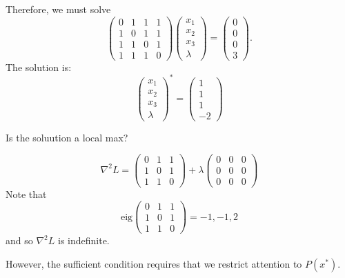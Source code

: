 \documentclass{article}
\begin{document}
	Therefore, we must solve
	\[ 
		\begin{pmatrix}
	    	0 & 1 & 1 & 1\\
	    	1 & 0 & 1 & 1\\
	    	1 & 1 & 0 & 1\\
	    	1 & 1 & 1 & 0
	  	\end{pmatrix}
	  	\begin{pmatrix}
	    	x_1\\
	    	x_2\\
	    	x_3\\
	    	\lambda
	  	\end{pmatrix} 
	  	= \begin{pmatrix}
	    	0\\0\\0\\3
	  	  \end{pmatrix}.
	\]
	The solution is:
	\[ 
		\begin{pmatrix}
	    	x_1\\
	    	x_2\\
	    	x_3\\
	    	\lambda 
	  	\end{pmatrix}^\ast
	  	= \begin{pmatrix}
	    	1\\1\\1\\-2
	  	  \end{pmatrix}
	\]

	Is the soluution a local max?
	
	\[ 
		\nabla^2L 
			= \begin{pmatrix}
	    		0 & 1 & 1\\
	    		1 & 0 & 1\\
	    		1 & 1 & 0
	  		  \end{pmatrix} 
	  		  + \lambda \begin{pmatrix}
	    					0 & 0 & 0\\
	    					0 & 0 & 0\\
	    					0 & 0 & 0
	  					\end{pmatrix}
	\]
	Note that 
	\[
		\text{eig}
			\begin{pmatrix}
	    		0 & 1 & 1\\
	    		1 & 0 & 1\\
	    		1 & 1 & 0   
	  		\end{pmatrix} = -1, -1, 2 
	\]
	and so $\nabla^2L$ is indefinite.  
		
	However, the sufficient condition requires that we restrict attention to $P(x^{\ast})$.
\end{document}

